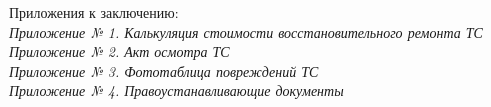 Приложения к заключению:\\

\noindent \textit{\small 
    Приложение № 1. Калькуляция стоимости восстановительного ремонта ТС \\
	Приложение № 2. Акт осмотра ТС \\
	Приложение № 3. Фототаблица повреждений ТС \\
	Приложение № 4. Правоустанавливающие документы\\}

\vspace{20mm}



%
%
%